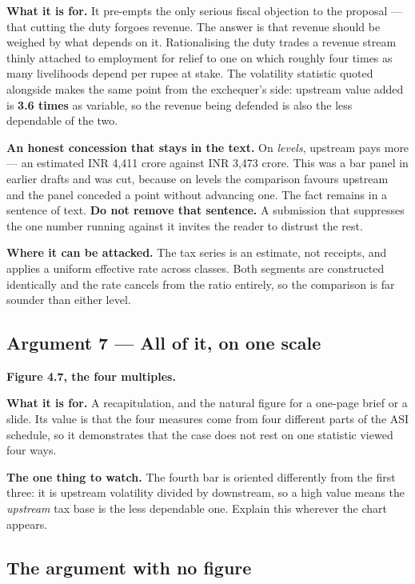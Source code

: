 \documentclass[11pt, a4paper]{article}
\begin{document}
\textbf{What it is for.} It pre-empts the only serious fiscal objection to the
proposal --- that cutting the duty forgoes revenue. The answer is that revenue should be
weighed by what depends on it. Rationalising the duty trades a revenue stream thinly
attached to employment for relief to one on which roughly four times as many
livelihoods depend per rupee at stake. The volatility statistic quoted alongside makes
the same point from the exchequer's side: upstream value added is \textbf{3.6 times}
as variable, so the revenue being defended is also the less dependable of the two.

\textbf{An honest concession that stays in the text.} On \emph{levels}, upstream pays
more --- an estimated INR 4,411 crore against INR 3,473 crore. This was a bar panel in
earlier drafts and was cut, because on levels the comparison favours upstream and the
panel conceded a point without advancing one. The fact remains in a sentence of text.
\textbf{Do not remove that sentence.} A submission that suppresses the one number
running against it invites the reader to distrust the rest.

\textbf{Where it can be attacked.} The tax series is an estimate, not receipts, and
applies a uniform effective rate across classes. Both segments are constructed
identically and the rate cancels from the ratio entirely, so the comparison is far
sounder than either level.

\subsection{Argument 7 --- All of it, on one scale}
\textbf{Figure 4.7, the four multiples.}

\textbf{What it is for.} A recapitulation, and the natural figure for a one-page
brief or a slide. Its value is that the four measures come from four different parts
of the ASI schedule, so it demonstrates that the case does not rest on one statistic
viewed four ways.

\textbf{The one thing to watch.} The fourth bar is oriented differently from the
first three: it is upstream volatility divided by downstream, so a high value means
the \emph{upstream} tax base is the less dependable one. Explain this wherever the
chart appears.

\subsection{The argument with no figure}
\end{document}

